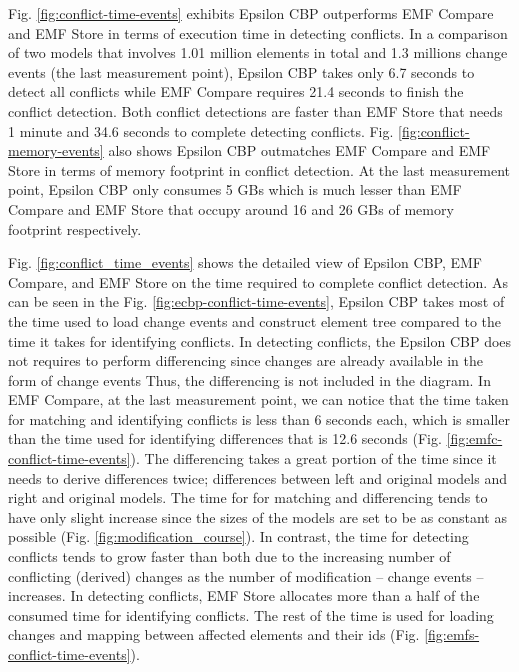 Fig. \ref{fig:conflict-time-events} exhibits Epsilon CBP outperforms EMF Compare and EMF Store in terms of execution time in detecting conflicts. In a comparison of two models that involves 1.01 million elements in total and 1.3 millions change events (the last measurement point), Epsilon CBP takes only 6.7 seconds to detect all conflicts while EMF Compare requires 21.4 seconds to finish the conflict detection. Both conflict detections are faster than EMF Store that needs 1 minute and 34.6 seconds to complete detecting conflicts. Fig. \ref{fig:conflict-memory-events} also shows Epsilon CBP outmatches EMF Compare and EMF Store in terms of memory footprint in conflict detection. At the last measurement point, Epsilon CBP only consumes 5 GBs which is much lesser than EMF Compare and EMF Store that occupy around 16 and 26 GBs of memory footprint respectively.

Fig. \ref{fig:conflict_time_events} shows the detailed view of Epsilon CBP, EMF Compare, and EMF Store on the time required to complete conflict detection. As can be seen in the Fig. \ref{fig:ecbp-conflict-time-events}, Epsilon CBP takes most of the time used to load change events and construct element tree compared to the time it takes for identifying conflicts. In detecting conflicts, the Epsilon CBP does not requires to perform differencing since changes are already available in the form of change events Thus, the differencing is not included in the diagram. In EMF Compare, at the last measurement point, we can notice that the time taken for matching and identifying conflicts is less than 6 seconds each, which is smaller than the time used for identifying differences that is 12.6 seconds (Fig. \ref{fig:emfc-conflict-time-events}). The differencing takes a great portion of the time since it needs to derive differences twice; differences between left and original models and right and original models. The time for for matching and differencing tends to have only slight increase since the sizes of the models are set to be as constant as possible (Fig. \ref{fig:modification_course}). In contrast, the time for detecting conflicts tends to grow faster than both due to the increasing number of conflicting (derived) changes as the number of modification -- change events -- increases. In detecting conflicts, EMF Store allocates more than a half of the consumed time for identifying conflicts. The rest of the time is used for loading changes and mapping between affected elements and their ids (Fig. \ref{fig:emfs-conflict-time-events}). 

